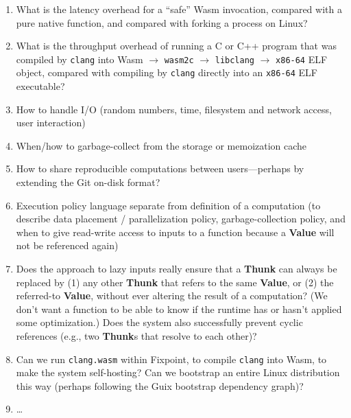 \documentclass{article}
\newcommand{\valuex}{\textbf{Value}\xspace}
\newcommand{\thunk}{\textbf{Thunk}\xspace}
\newcommand{\thunks}{\textbf{Thunk}s\xspace}
\begin{document}
\begin{enumerate}[topsep=0pt]
\item What is the latency overhead for a ``safe'' Wasm invocation, compared with a pure native function,
  and compared with forking a process on Linux?

\item What is the throughput overhead of running a C or C++ program
  that was compiled by \texttt{clang} into Wasm $\rightarrow$
  \texttt{wasm2c} $\rightarrow$ \texttt{libclang} $\rightarrow$
  \texttt{x86-64} ELF object, compared with compiling by \texttt{clang}
  directly into an \texttt{x86-64} ELF executable?

\item How to handle I/O (random numbers, time, filesystem and network access, user interaction)

\item When/how to garbage-collect from the storage or memoization cache

\item How to share reproducible computations between users---perhaps by extending the Git on-disk format?
  
\item Execution policy language separate from definition of a
  computation (to describe data placement / parallelization policy,
  garbage-collection policy, and when to give read-write access to
  inputs to a function because a \valuex will not be referenced again)

\item Does the approach to lazy inputs really ensure that a \thunk can
  always be replaced by (1) any other \thunk that refers to the same
  \valuex, or (2) the referred-to \valuex, without ever altering the
  result of a computation? (We don't want a function to be able to
  know if the runtime has or hasn't applied some optimization.) Does
  the system also successfully prevent cyclic references (e.g., two \thunks that resolve to
  each other)?

\item Can we run \texttt{clang.wasm} within Fixpoint, to compile
  \texttt{clang} into Wasm, to make the system self-hosting? Can we bootstrap an entire Linux distribution
  this way (perhaps following the Guix bootstrap dependency graph)?
 
\item \ldots
  
\end{enumerate}
\end{document}
